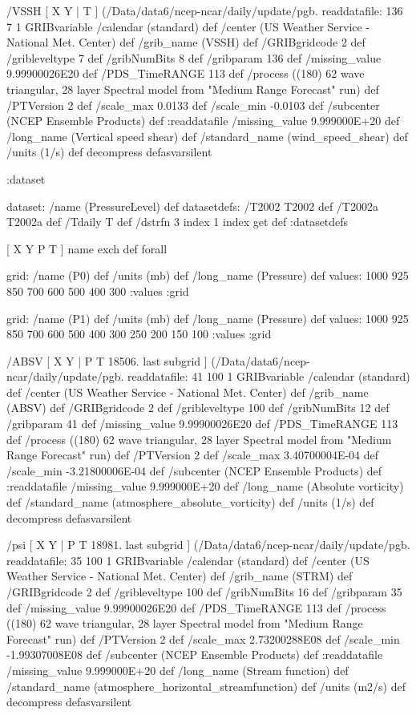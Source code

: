 \begin{ingrid}
  /VSSH { [ X Y | T ] (/Data/data6/ncep-ncar/daily/update/pgb.%
  readdatafile:
  136 7 1 GRIBvariable
  /calendar (standard) def
  /center (US Weather Service - National Met. Center) def
  /grib_name (VSSH) def
  /GRIBgridcode 2 def
  /gribleveltype 7 def
  /gribNumBits 8 def
  /gribparam 136 def
  /missing_value 9.99900026E20 def
  /PDS_TimeRANGE 113 def
  /process ((180) 62 wave triangular, 28 layer Spectral model from "Medium Range Forecast" run) def
  /PTVersion 2 def
  /scale_max 0.0133 def
  /scale_min -0.0103 def
  /subcenter (NCEP Ensemble Products) def
  :readdatafile
  /missing_value 9.999000E+20 def
  /long_name (Vertical speed shear) def
  /standard_name (wind_speed_shear) def
  /units (1/s) def
  decompress
  } defasvarsilent

 :dataset

 dataset: /name (PressureLevel) def 
datasetdefs:
  /T2002 T2002 def
  /T2002a T2002a def
/Tdaily T def
/dstrfn 3 index 1 index get def
:datasetdefs

  [ X Y P T ] { name exch def } forall

grid:
/name (P0) def
/units (mb) def
/long_name (Pressure) def
values: 1000 925 850 700 600 500 400 300 :values
:grid

grid:
/name (P1) def
/units (mb) def
/long_name (Pressure) def
values: 1000 925 850 700 600 500 400 300 250 200 150 100 :values
:grid


  /ABSV { [ X Y | P T 18506. last subgrid ] (/Data/data6/ncep-ncar/daily/update/pgb.%
  readdatafile:
  41 100 1 GRIBvariable
  /calendar (standard) def
  /center (US Weather Service - National Met. Center) def
  /grib_name (ABSV) def
  /GRIBgridcode 2 def
  /gribleveltype 100 def
  /gribNumBits 12 def
  /gribparam 41 def
  /missing_value 9.99900026E20 def
  /PDS_TimeRANGE 113 def
  /process ((180) 62 wave triangular, 28 layer Spectral model from "Medium Range Forecast" run) def
  /PTVersion 2 def
  /scale_max 3.40700004E-04 def
  /scale_min -3.21800006E-04 def
  /subcenter (NCEP Ensemble Products) def
  :readdatafile
  /missing_value 9.999000E+20 def
  /long_name (Absolute vorticity) def
  /standard_name (atmosphere_absolute_vorticity) def
  /units (1/s) def
  decompress
  } defasvarsilent

  /psi { [ X Y | P T 18981. last subgrid ] (/Data/data6/ncep-ncar/daily/update/pgb.%
  readdatafile:
  35 100 1 GRIBvariable
  /calendar (standard) def
  /center (US Weather Service - National Met. Center) def
  /grib_name (STRM) def
  /GRIBgridcode 2 def
  /gribleveltype 100 def
  /gribNumBits 16 def
  /gribparam 35 def
  /missing_value 9.99900026E20 def
  /PDS_TimeRANGE 113 def
  /process ((180) 62 wave triangular, 28 layer Spectral model from "Medium Range Forecast" run) def
  /PTVersion 2 def
  /scale_max 2.73200288E08 def
  /scale_min -1.99307008E08 def
  /subcenter (NCEP Ensemble Products) def
  :readdatafile
  /missing_value 9.999000E+20 def
  /long_name (Stream function) def
  /standard_name (atmosphere_horizontal_streamfunction) def
  /units (m2/s) def
  decompress
  } defasvarsilent


\end{ingrid}
